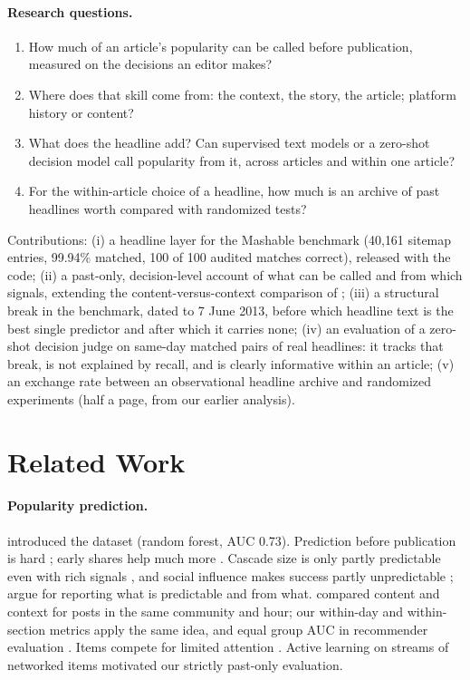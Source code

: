 \documentclass[10pt,a4paper,twocolumn]{article}
\begin{document}
\paragraph{Research questions.}
\begin{enumerate}\setlength\itemsep{0pt}
  \item[RQ1] How much of an article's popularity can be called before publication, measured on the decisions an
             editor makes?
  \item[RQ2] Where does that skill come from: the context, the story, the article; platform history or content?
  \item[RQ3] What does the headline add? Can supervised text models or a zero-shot decision model call
             popularity from it, across articles and within one article?
  \item[RQ4] For the within-article choice of a headline, how much is an archive of past headlines worth compared
             with randomized tests?
\end{enumerate}
\noindent Contributions: (i) a headline layer for the Mashable benchmark (40{,}161 sitemap entries, 99.94\% matched,
100 of 100 audited matches correct), released with the code; (ii) a past-only, decision-level account of
what can be called and from which signals, extending the content-versus-context comparison of
\citet{hessel2017}; (iii) a structural break in the benchmark, dated to 7 June 2013, before which headline text is the
best single predictor and after which it carries none; (iv) an evaluation of a zero-shot decision judge
\citep{zheng2023judge,li2026jev} on same-day matched pairs of real headlines: it tracks that break, is not
explained by recall, and is clearly informative within an article; (v) an exchange rate
between an observational headline archive and randomized experiments (half a page, from our earlier analysis).

\section{Related Work}
\paragraph{Popularity prediction.} \citet{fernandes2015} introduced the dataset (random forest, AUC 0.73).
Prediction before publication is hard \citep{bandari2012}; early shares help much more \citep{szabo2010}.
Cascade size is only partly predictable even with rich signals \citep{cheng2014,martin2016}, and social influence
makes success partly unpredictable \citep{salganik2006}; \citet{hofman2017} argue for reporting what is
predictable and from what. \citet{hessel2017} compared content and context for posts in the same community and
hour; our within-day and within-section metrics apply the same idea, and equal group AUC in recommender
evaluation \citep{zhou2018}. Items compete for limited attention \citep{wu2007,weng2012}. Active learning on
streams of networked items \citep{yang2014wsdm,yang2014cikm} motivated our strictly past-only evaluation.
\end{document}
